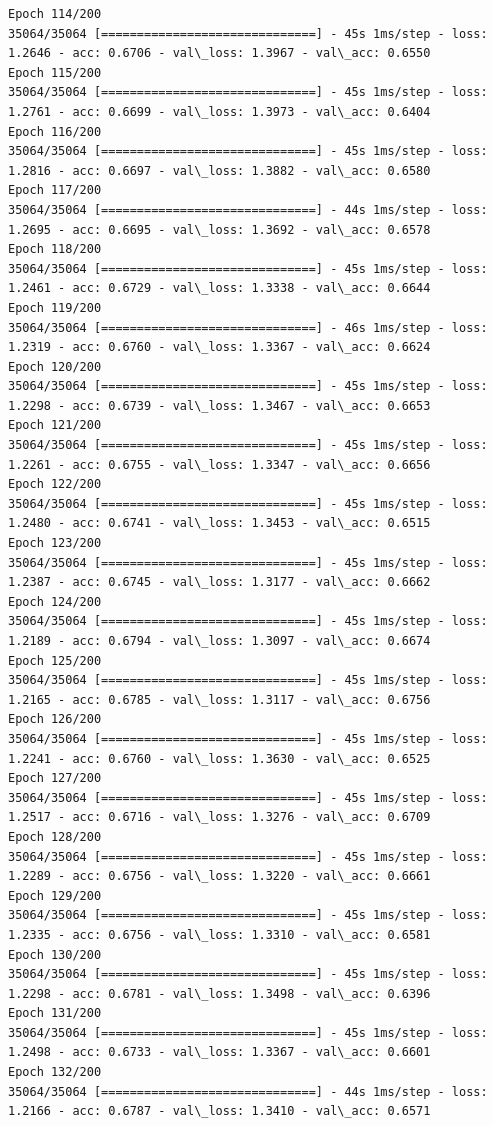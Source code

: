 \documentclass[11pt]{article}
\begin{document}
\begin{Verbatim}[commandchars=\\\{\}]
Epoch 114/200
35064/35064 [==============================] - 45s 1ms/step - loss: 1.2646 - acc: 0.6706 - val\_loss: 1.3967 - val\_acc: 0.6550
Epoch 115/200
35064/35064 [==============================] - 45s 1ms/step - loss: 1.2761 - acc: 0.6699 - val\_loss: 1.3973 - val\_acc: 0.6404
Epoch 116/200
35064/35064 [==============================] - 45s 1ms/step - loss: 1.2816 - acc: 0.6697 - val\_loss: 1.3882 - val\_acc: 0.6580
Epoch 117/200
35064/35064 [==============================] - 44s 1ms/step - loss: 1.2695 - acc: 0.6695 - val\_loss: 1.3692 - val\_acc: 0.6578
Epoch 118/200
35064/35064 [==============================] - 45s 1ms/step - loss: 1.2461 - acc: 0.6729 - val\_loss: 1.3338 - val\_acc: 0.6644
Epoch 119/200
35064/35064 [==============================] - 46s 1ms/step - loss: 1.2319 - acc: 0.6760 - val\_loss: 1.3367 - val\_acc: 0.6624
Epoch 120/200
35064/35064 [==============================] - 45s 1ms/step - loss: 1.2298 - acc: 0.6739 - val\_loss: 1.3467 - val\_acc: 0.6653
Epoch 121/200
35064/35064 [==============================] - 45s 1ms/step - loss: 1.2261 - acc: 0.6755 - val\_loss: 1.3347 - val\_acc: 0.6656
Epoch 122/200
35064/35064 [==============================] - 45s 1ms/step - loss: 1.2480 - acc: 0.6741 - val\_loss: 1.3453 - val\_acc: 0.6515
Epoch 123/200
35064/35064 [==============================] - 45s 1ms/step - loss: 1.2387 - acc: 0.6745 - val\_loss: 1.3177 - val\_acc: 0.6662
Epoch 124/200
35064/35064 [==============================] - 45s 1ms/step - loss: 1.2189 - acc: 0.6794 - val\_loss: 1.3097 - val\_acc: 0.6674
Epoch 125/200
35064/35064 [==============================] - 45s 1ms/step - loss: 1.2165 - acc: 0.6785 - val\_loss: 1.3117 - val\_acc: 0.6756
Epoch 126/200
35064/35064 [==============================] - 45s 1ms/step - loss: 1.2241 - acc: 0.6760 - val\_loss: 1.3630 - val\_acc: 0.6525
Epoch 127/200
35064/35064 [==============================] - 45s 1ms/step - loss: 1.2517 - acc: 0.6716 - val\_loss: 1.3276 - val\_acc: 0.6709
Epoch 128/200
35064/35064 [==============================] - 45s 1ms/step - loss: 1.2289 - acc: 0.6756 - val\_loss: 1.3220 - val\_acc: 0.6661
Epoch 129/200
35064/35064 [==============================] - 45s 1ms/step - loss: 1.2335 - acc: 0.6756 - val\_loss: 1.3310 - val\_acc: 0.6581
Epoch 130/200
35064/35064 [==============================] - 45s 1ms/step - loss: 1.2298 - acc: 0.6781 - val\_loss: 1.3498 - val\_acc: 0.6396
Epoch 131/200
35064/35064 [==============================] - 45s 1ms/step - loss: 1.2498 - acc: 0.6733 - val\_loss: 1.3367 - val\_acc: 0.6601
Epoch 132/200
35064/35064 [==============================] - 44s 1ms/step - loss: 1.2166 - acc: 0.6787 - val\_loss: 1.3410 - val\_acc: 0.6571

\end{Verbatim}
\end{document}
